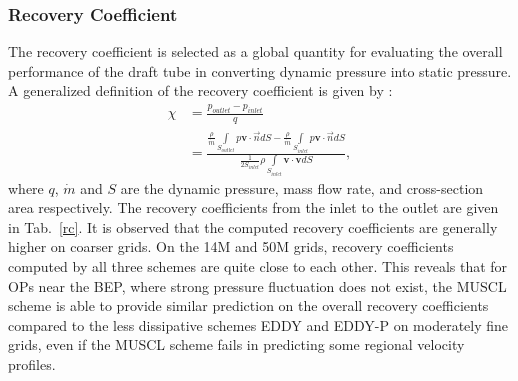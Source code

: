 \subsubsection{Recovery Coefficient}
The recovery coefficient is selected as a global quantity for evaluating the overall performance of the draft tube in converting dynamic pressure into static pressure. A generalized definition of the recovery coefficient is given by \cite{fox1971effects}: 
\begin{align} 
\chi&=\frac{p_{outlet}-p_{inlet}}{q}\\
&=\frac{\frac{\rho}{\dot{m}}\underset{S_{outlet}}{\int}p\mathbf{v}\cdot \vec{n}dS-\frac{\rho}{\dot{m}}\underset{S_{inlet}}{\int}p\mathbf{v}\cdot \vec{n}dS}{\frac{1}{2S_{inlet}}\rho\underset{S_{inlet}}{\int}\mathbf{v}\cdot\mathbf{v}dS}, 
\end{align}
where $q$, $\dot{m}$ and $S$ are the dynamic pressure, mass flow rate, and cross-section area respectively. The recovery coefficients from the inlet to the outlet are given in Tab.~\ref{rc}. It is observed that the computed recovery coefficients are generally higher on coarser grids. On the 14M and 50M grids, recovery coefficients computed by all three schemes are quite close to each other. This reveals that for OPs near the BEP, where strong pressure fluctuation does not exist, the MUSCL scheme is able to provide similar prediction on the overall recovery coefficients compared to the less dissipative schemes EDDY and EDDY-P on moderately fine grids, even if the MUSCL scheme fails in predicting some regional velocity profiles.
